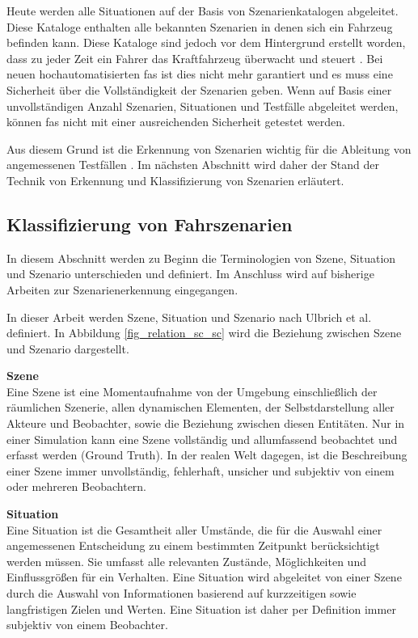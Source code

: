 Heute werden alle Situationen auf der Basis von Szenarienkatalogen abgeleitet. Diese Kataloge enthalten alle bekannten Szenarien in denen sich ein Fahrzeug befinden kann. Diese Kataloge sind jedoch vor dem Hintergrund erstellt worden, dass zu jeder Zeit ein Fahrer das Kraftfahrzeug überwacht und steuert \cite{wachenfeld2015freigabe}. Bei neuen hochautomatisierten \gls{fas} ist dies nicht mehr garantiert und es muss eine Sicherheit über die Vollständigkeit der Szenarien geben. Wenn auf Basis einer unvollständigen Anzahl Szenarien, Situationen und Testfälle abgeleitet werden, können \gls{fas} nicht mit einer ausreichenden Sicherheit getestet werden.

Aus diesem Grund ist die Erkennung von Szenarien wichtig für die Ableitung von angemessenen Testfällen \cite{otten2018automated}. Im nächsten Abschnitt wird daher der Stand der Technik von Erkennung und Klassifizierung von Szenarien erläutert.


\subsection{Klassifizierung von Fahrszenarien}
\label{grundlagen_fahren_szenarien}

In diesem Abschnitt werden zu Beginn die Terminologien von Szene, Situation und Szenario unterschieden und definiert. Im Anschluss wird auf bisherige Arbeiten zur Szenarienerkennung eingegangen.

In dieser Arbeit werden Szene, Situation und Szenario nach Ulbrich et al. \cite{ulbrich2015defining} definiert. In Abbildung \ref{fig_relation_sc_sc} wird die Beziehung zwischen Szene und Szenario dargestellt.

\noindent\textbf{Szene}\\
Eine Szene ist eine Momentaufnahme von der Umgebung einschließlich der räumlichen Szenerie,  allen dynamischen Elementen, der Selbstdarstellung aller Akteure und Beobachter, sowie die Beziehung zwischen diesen Entitäten. Nur in einer Simulation kann eine Szene vollständig und allumfassend beobachtet und erfasst werden (Ground Truth). In der realen Welt dagegen, ist die Beschreibung einer Szene immer unvollständig, fehlerhaft, unsicher und subjektiv von einem oder mehreren Beobachtern.

\noindent\textbf{Situation}\\
Eine Situation ist die Gesamtheit aller Umstände, die für die Auswahl einer angemessenen Entscheidung zu einem bestimmten Zeitpunkt berücksichtigt werden müssen. Sie umfasst alle relevanten Zustände, Möglichkeiten und Einflussgrößen für ein Verhalten. Eine Situation wird abgeleitet von einer Szene durch die Auswahl von Informationen basierend auf kurzzeitigen sowie langfristigen Zielen und Werten. Eine Situation ist daher per Definition immer subjektiv von einem Beobachter.


